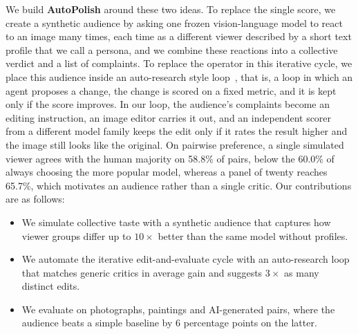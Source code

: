 \documentclass[runningheads]{llncs}
\begin{document}
We build \textbf{AutoPolish} around these two ideas. To replace the single score, we create a synthetic audience by asking one frozen vision-language model to react to an image many times, each time as a different viewer described by a short text profile that we call a persona, and we combine these reactions into a collective verdict and a list of complaints. To replace the operator in this iterative cycle, we place this audience inside an auto-research style loop~\cite{karpathy2026autoresearch}, that is, a loop in which an agent proposes a change, the change is scored on a fixed metric, and it is kept only if the score improves. In our loop, the audience's complaints become an editing instruction, an image editor carries it out, and an independent scorer from a different model family keeps the edit only if it rates the result higher and the image still looks like the original. On pairwise preference, a single simulated viewer agrees with the human majority on 58.8\% of pairs, below the 60.0\% of always choosing the more popular model, whereas a panel of twenty reaches 65.7\%, which motivates an audience rather than a single critic. Our contributions are as follows:
\begin{itemize}[leftmargin=1.4em, itemsep=2pt, topsep=2pt, parsep=0pt, partopsep=0pt]
\item We simulate collective taste with a synthetic audience that captures how viewer groups differ up to $10\times$ better than the same model without profiles.

\item We automate the iterative edit-and-evaluate cycle with an auto-research loop that matches generic critics in average gain and suggests $3\times$ as many distinct edits.

\item We evaluate on photographs, paintings and AI-generated pairs, where the audience beats a simple baseline by 6 percentage points on the latter.
\end{itemize}
\end{document}
